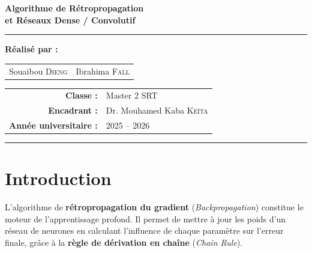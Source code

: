 \documentclass[12pt, a4paper]{article}
\begin{document}
\begin{titlepage}
    \vspace{0.3cm}

    {\LARGE\bfseries\color{espblue}
        Algorithme de Rétropropagation\\[5pt]
        et Réseaux Dense / Convolutif
    }

    \vspace{0.3cm}
    {\color{espgold}\rule{0.8\linewidth}{1.5pt}}
    \vspace{0.5cm}

    \Large\bfseries Réalisé par :\\[0.4cm]
    \begin{tabular}{cc}
        \Large\color{espblue} Souaibou \textsc{Dieng} &
        \Large\color{espblue} Ibrahima \textsc{Fall} \\
    \end{tabular}

    \vfill

    \begin{tabular}{rl}
        \textbf{Classe :}              & Master 2 SRT \\[3pt]
        \textbf{Encadrant :}           & Dr. Mouhamed Kaba \textsc{Keïta} \\[3pt]
        \textbf{Année universitaire :} & 2025 -- 2026 \\
    \end{tabular}

    \vspace{0.4cm}
    {\color{espblue}\rule{\linewidth}{3pt}}
\end{titlepage}

\tableofcontents
\thispagestyle{fancy}
\newpage

\section*{Introduction}

L'algorithme de \textbf{rétropropagation du gradient}
(\textit{Backpropagation}) constitue le moteur de l'apprentissage profond.
Il permet de mettre à jour les poids d'un réseau de neurones en calculant
l'influence de chaque paramètre sur l'erreur finale, grâce à la
\textbf{règle de dérivation en chaîne} (\textit{Chain Rule}).
\end{document}
